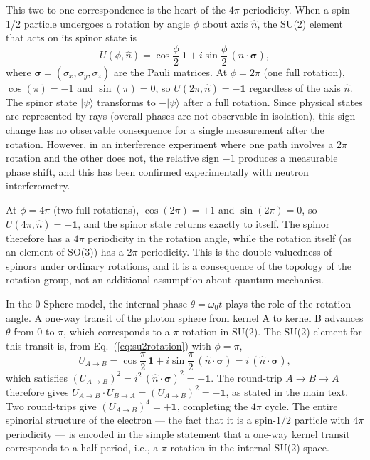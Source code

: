 \documentclass[%
 reprint,
 amsmath,amssymb,
 aps,
 prb,
]{revtex4-2}
\numberwithin{equation}{section}
\newcommand{\iphase}{\theta}  %
\begin{document}
This two-to-one correspondence is the heart of the $4\pi$ periodicity. When a spin-1/2 particle undergoes a rotation by angle $\phi$ about axis $\hat{n}$, the SU(2) element that acts on its spinor state is
\begin{equation}
U(\phi, \hat{n}) = \cos\frac{\phi}{2}\,\mathbf{1} + i\sin\frac{\phi}{2}\,(\hat{n}\cdot\bm{\sigma}),
\label{eq:su2rotation}
\end{equation}
where $\bm{\sigma} = (\sigma_x, \sigma_y, \sigma_z)$ are the Pauli matrices. At $\phi = 2\pi$ (one full rotation), $\cos(\pi) = -1$ and $\sin(\pi) = 0$, so $U(2\pi, \hat{n}) = -\mathbf{1}$ regardless of the axis $\hat{n}$. The spinor state $|\psi\rangle$ transforms to $-|\psi\rangle$ after a full rotation. Since physical states are represented by rays (overall phases are not observable in isolation), this sign change has no observable consequence for a single measurement after the rotation. However, in an interference experiment where one path involves a $2\pi$ rotation and the other does not, the relative sign $-1$ produces a measurable phase shift, and this has been confirmed experimentally with neutron interferometry.

At $\phi = 4\pi$ (two full rotations), $\cos(2\pi) = +1$ and $\sin(2\pi) = 0$, so $U(4\pi, \hat{n}) = +\mathbf{1}$, and the spinor state returns exactly to itself. The spinor therefore has a $4\pi$ periodicity in the rotation angle, while the rotation itself (as an element of SO(3)) has a $2\pi$ periodicity. This is the double-valuedness of spinors under ordinary rotations, and it is a consequence of the topology of the rotation group, not an additional assumption about quantum mechanics.

In the 0-Sphere model, the internal phase $\iphase = \omega_0 t$ plays the role of the rotation angle. A one-way transit of the photon sphere from kernel A to kernel B advances $\iphase$ from $0$ to $\pi$, which corresponds to a $\pi$-rotation in SU(2). The SU(2) element for this transit is, from Eq.~(\ref{eq:su2rotation}) with $\phi = \pi$,
\begin{equation}
U_{A\to B} = \cos\frac{\pi}{2}\,\mathbf{1} + i\sin\frac{\pi}{2}\,(\hat{n}\cdot\bm{\sigma}) = i\,(\hat{n}\cdot\bm{\sigma}),
\label{eq:uab_explicit}
\end{equation}
which satisfies $(U_{A\to B})^2 = i^2\,(\hat{n}\cdot\bm{\sigma})^2 = -\mathbf{1}$. The round-trip $A\to B\to A$ therefore gives $U_{A\to B}\cdot U_{B\to A} = (U_{A\to B})^2 = -\mathbf{1}$, as stated in the main text. Two round-trips give $(U_{A\to B})^4 = +\mathbf{1}$, completing the $4\pi$ cycle. The entire spinorial structure of the electron --- the fact that it is a spin-1/2 particle with $4\pi$ periodicity --- is encoded in the simple statement that a one-way kernel transit corresponds to a half-period, i.e., a $\pi$-rotation in the internal SU(2) space.
\end{document}
